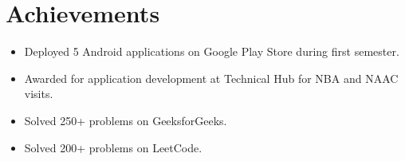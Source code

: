 \documentclass[11pt,a4paper]{article}
\begin{document}
\section{Achievements}
\begin{itemize}
    \item Deployed 5 Android applications on Google Play Store during first semester.
    \item Awarded for application development at Technical Hub for NBA and NAAC visits.
    \item Solved 250+ problems on GeeksforGeeks.
    \item Solved 200+ problems on LeetCode.
\end{itemize}
\end{document}
